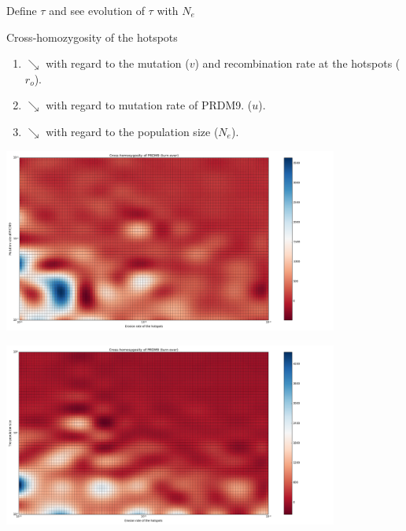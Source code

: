 \documentclass[10pt]{beamer}
\begin{document}
\begin{frame}
	\begin{center}
	\Large
    Define $\tau$ and see evolution of $\tau$ with $N_e$
	\end{center}
\end{frame}

\begin{frame}
	\begin{center}
		\Large
    	Cross-homozygosity of the hotspots
	\end{center}
	\begin{enumerate}
		\item $\searrow$ with regard to the mutation ($v$) and recombination rate at the hotspots ($r_o$).
		
		\item $\searrow$ with regard to mutation rate of PRDM9. ($u$).
		
		\item $\searrow$ with regard to the population size ($N_e$).
		
	\end{enumerate}
\end{frame}

\begin{frame}
	\begin{center}
       \includegraphics[width=11cm]{Images/cross-homozygosity-mutation-erosion.png}
	\end{center}
\end{frame}


\begin{frame}
	\begin{center}
       \includegraphics[width=11cm]{Images/cross-homozygosity-population-erosion.png}
	\end{center}
\end{frame}
\end{document}
